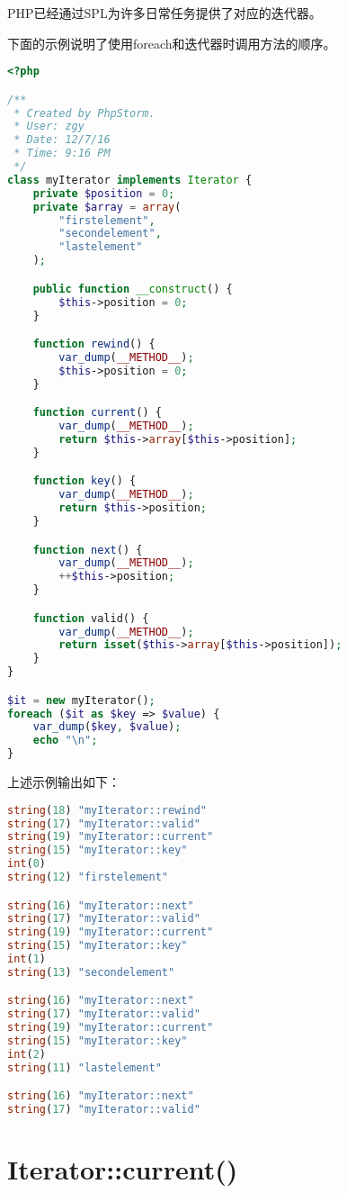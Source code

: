 PHP已经通过SPL为许多日常任务提供了对应的迭代器。

下面的示例说明了使用foreach和迭代器时调用方法的顺序。


\begin{lstlisting}[language=PHP]
<?php

/**
 * Created by PhpStorm.
 * User: zgy
 * Date: 12/7/16
 * Time: 9:16 PM
 */
class myIterator implements Iterator {
    private $position = 0;
    private $array = array(
        "firstelement",
        "secondelement",
        "lastelement"
    );

    public function __construct() {
        $this->position = 0;
    }

    function rewind() {
        var_dump(__METHOD__);
        $this->position = 0;
    }

    function current() {
        var_dump(__METHOD__);
        return $this->array[$this->position];
    }

    function key() {
        var_dump(__METHOD__);
        return $this->position;
    }

    function next() {
        var_dump(__METHOD__);
        ++$this->position;
    }

    function valid() {
        var_dump(__METHOD__);
        return isset($this->array[$this->position]);
    }
}

$it = new myIterator();
foreach ($it as $key => $value) {
    var_dump($key, $value);
    echo "\n";
}
\end{lstlisting}

上述示例输出如下：

\begin{lstlisting}[language=PHP]
string(18) "myIterator::rewind"
string(17) "myIterator::valid"
string(19) "myIterator::current"
string(15) "myIterator::key"
int(0)
string(12) "firstelement"

string(16) "myIterator::next"
string(17) "myIterator::valid"
string(19) "myIterator::current"
string(15) "myIterator::key"
int(1)
string(13) "secondelement"

string(16) "myIterator::next"
string(17) "myIterator::valid"
string(19) "myIterator::current"
string(15) "myIterator::key"
int(2)
string(11) "lastelement"

string(16) "myIterator::next"
string(17) "myIterator::valid"
\end{lstlisting}

\section{Iterator::current()}

